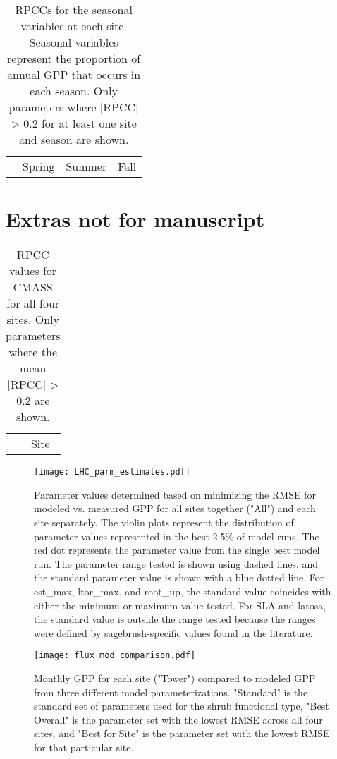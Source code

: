 \documentclass[]{article}
\begin{document}
\begin{table}[ht]
	\centering
	\caption{RPCCs for the seasonal variables at each site. Seasonal variables represent the proportion of annual GPP that occurs in each season. Only parameters where |RPCC| > 0.2 for at least one site and season are shown.} 
	\begin{tabularx}{\textwidth}{lrrrrrrrrrrrr}
		\toprule
		& \multicolumn{4}{c}{Spring} & \multicolumn{4}{c}{Summer} & \multicolumn{4}{c}{Fall} \\
		\cmidrule(lr){2-5} \cmidrule(lr){6-9} \cmidrule(lr){10-13}
		
	\end{tabularx}
\end{table}

\section{Extras not for manuscript}
\begin{table}[htbp]
	\centering
	\caption{RPCC values for CMASS for all four sites. Only parameters where the mean |RPCC| > 0.2 are shown.}
	\begin{tabular}{lrrrrr}
		\toprule
		\multicolumn{2}{c}{} & \multicolumn{4}{c}{Site} \\
		\cmidrule(lr){3-6}
		
	\end{tabular}
\end{table}

\begin{figure}[htbp]
	\texttt{[image: LHC\_parm\_estimates.pdf]}
	\caption{Parameter values determined based on minimizing the RMSE for modeled vs. measured GPP for all sites together ("All") and each site separately. The violin plots represent the distribution of parameter values represented in the best 2.5\% of model runs. The red dot represents the parameter value from the single best model run. The parameter range tested is shown using dashed lines, and the standard parameter value is shown with a blue dotted line. For est\_max, ltor\_max, and root\_up, the standard value coincides with either the minimum or maximum value tested. For SLA and latosa, the standard value is outside the range tested because the ranges were defined by sagebrush-specific values found in the literature.}
	\label{fig:LHCparms}
\end{figure}

\begin{figure}[htbp]
	\texttt{[image: flux\_mod\_comparison.pdf]}
	\caption{Monthly GPP for each site ("Tower") compared to modeled GPP from three different model parameterizations. "Standard" is the standard set of parameters used for the shrub functional type, "Best Overall" is the parameter set with the lowest RMSE across all four sites, and "Best for Site" is the parameter set with the lowest RMSE for that particular site.}
	\label{fig:fluxmod}
\end{figure}
\section{}
\end{document}
